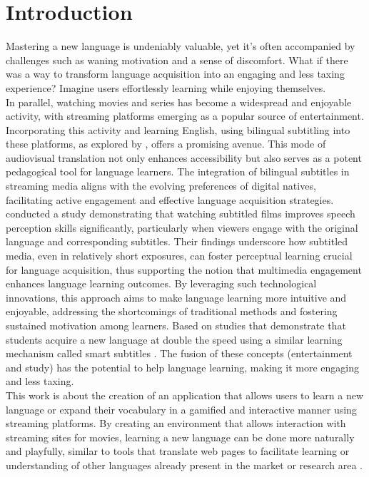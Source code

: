 \documentclass[12pt]{article}
\begin{document}
\section{Introduction}
Mastering a new language is undeniably valuable, yet it's often accompanied by challenges such as waning motivation and a sense of discomfort. What if there was a way to transform language acquisition into an engaging and less taxing experience? Imagine users effortlessly learning while enjoying themselves. \\
In parallel, watching movies and series has become a widespread and enjoyable activity, with streaming platforms emerging as a popular source of entertainment. Incorporating this activity and learning English, using bilingual subtitling into these platforms, as explored by \cite{Gouleti-Katerina}, offers a promising avenue. This mode of audiovisual translation not only enhances accessibility but also serves as a potent pedagogical tool for language learners. The integration of bilingual subtitles in streaming media aligns with the evolving preferences of digital natives, facilitating active engagement and effective language acquisition strategies.\\
\cite{Birules-Muntane2016-on} conducted a study demonstrating that watching subtitled films improves speech perception skills significantly, particularly when viewers engage with the original language and corresponding subtitles. Their findings underscore how subtitled media, even in relatively short exposures, can foster perceptual learning crucial for language acquisition, thus supporting the notion that multimedia engagement enhances language learning outcomes.
By leveraging such technological innovations, this approach aims to make language learning more intuitive and enjoyable, addressing the shortcomings of traditional methods and fostering sustained motivation among learners.
Based on studies that demonstrate that students acquire a new language at double the speed using a similar learning mechanism called smart subtitles \cite{Kovacs13}. The fusion of these concepts (entertainment and study) has the potential to help language learning, making it more engaging and less taxing. \\
This work is about the creation of an application that allows users to learn a new language or expand their vocabulary in a gamified and interactive manner using streaming platforms.
By creating an environment that allows interaction with streaming sites for movies, learning a new language can be done more naturally and playfully, similar to tools that translate web pages to facilitate learning or understanding of other languages already present in the market or research area \cite{ElBatanony21}. \\
\end{document}
